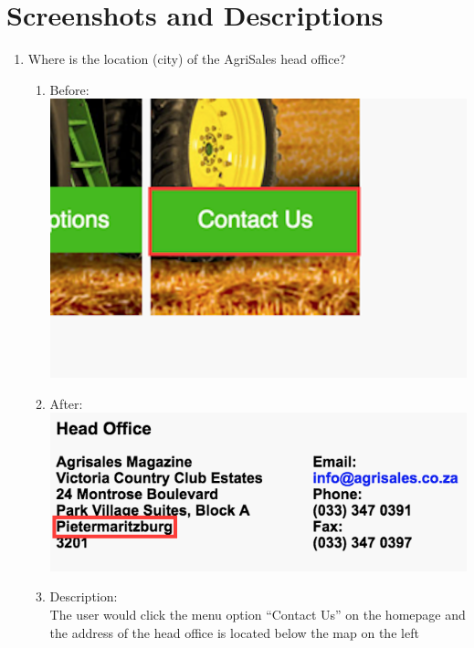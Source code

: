 \documentclass[11pt]{article}
\begin{document}
\newpage

\section{Screenshots and Descriptions}
	\begin{enumerate}
		
		\item Where is the location (city) of the AgriSales head office?
				\begin{enumerate}
					\item Before: \\
						\includegraphics[width=0.3\linewidth]{../Images/Tasks/Task1Before}
					\item After: \\
						\includegraphics[width=0.5\linewidth]{../Images/Tasks/Task1After}
					\item Description: \\The user would click the menu option “Contact Us” on the homepage and the address of the head office is located below the map on the left
				\end{enumerate}
				

\end{enumerate}
\end{document}
